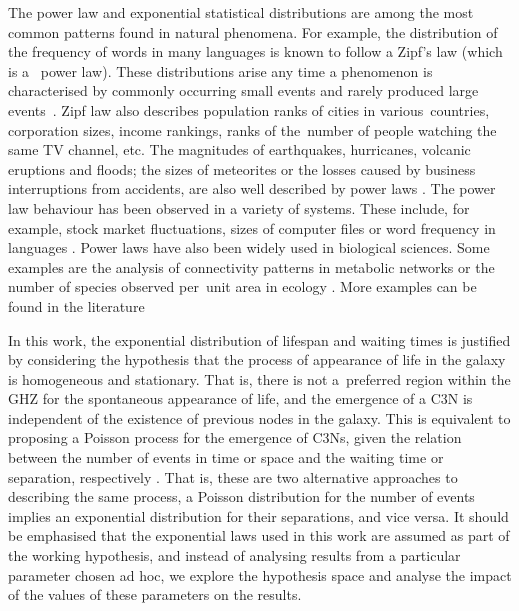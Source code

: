 \documentclass[crop]{CSLB}
\newcommand{\ceti}{C3N}
\newcommand{\cetis}{C3Ns}
\begin{document}
The power law and exponential statistical distributions are among the most common patterns found in natural phenomena.
%
For example, the distribution of the frequency of words in many languages is known to follow a Zipf’s law (which is a 
power law).
%
These distributions arise any time a phenomenon is characterised by commonly occurring small events and rarely produced
large events \citep[e.g. ][]{adamic_zipf_2000}.
%
Zipf law also describes population ranks of cities in various countries, corporation sizes, income rankings, ranks of
the number of people watching the same TV channel, etc.
%
The magnitudes of earthquakes, hurricanes, volcanic eruptions and floods; the sizes of meteorites or the losses caused
by business interruptions from accidents, are also well described by power laws
\citep{sornette_critical_2006}.
%
The power law behaviour has been observed in a variety of systems.
%
These include, for example, stock market fluctuations, sizes of computer files or word frequency in languages
\citep{mitzenmacher_brief_2004, newman_power_2005, simkin_theory_2006}. 
%
Power laws have also been widely used in
biological sciences.
%
Some examples are the analysis of connectivity patterns in metabolic networks \citep{jeong_large_2000} or the number of
species observed per unit area in ecology \citep{martin_origin_2006, frank_common_2009}.
%
More examples can be found in the literature 
\citep{martin_origin_2006, maccone_KLT_2010}
\citep{barabasi_scale_2009, maccone_evolution_2014}
\citep{maccone_lognormals_2014}


In this work, the exponential distribution of lifespan and waiting times is justified by considering the hypothesis that the process of appearance of life in the galaxy is homogeneous and stationary. That is, there is not a preferred region within the GHZ for the spontaneous appearance of life, and the emergence of a \ceti{} is independent of the existence of previous nodes in the galaxy. This is equivalent to proposing a Poisson process for the emergence of \cetis{}, given the relation between the number of events in time or space and the waiting time or separation, respectively
\citep[e.g., ][]{ross_simulation_2012}. That is, these are two alternative approaches to describing the same process, a Poisson distribution for the number of events implies an exponential distribution for their separations, and vice versa. It should be emphasised that the exponential laws used in this work are assumed as part of the working hypothesis, and instead of analysing results from a particular parameter chosen ad hoc, we explore the hypothesis space and analyse the impact of the values of these parameters on the results.
\end{document}
